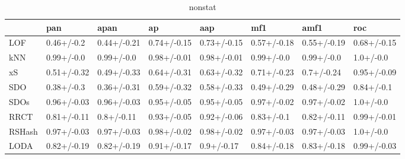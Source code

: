 \begin{table}
\centering
\caption{nonstat}
\begin{tabular}{llllllll}
\toprule
{} &          pan &         apan &           ap &          aap &          mf1 &         amf1 &          roc \\
\midrule
LOF    &   0.46+/-0.2 &  0.44+/-0.21 &  0.74+/-0.15 &  0.73+/-0.15 &  0.57+/-0.18 &  0.55+/-0.19 &  0.68+/-0.15 \\
kNN    &   0.99+/-0.0 &   0.99+/-0.0 &  0.98+/-0.01 &  0.98+/-0.01 &   0.99+/-0.0 &   0.99+/-0.0 &    1.0+/-0.0 \\
xS     &  0.51+/-0.32 &  0.49+/-0.33 &  0.64+/-0.31 &  0.63+/-0.32 &  0.71+/-0.23 &   0.7+/-0.24 &  0.95+/-0.09 \\
SDO    &   0.38+/-0.3 &  0.36+/-0.31 &  0.59+/-0.32 &  0.58+/-0.33 &  0.49+/-0.29 &  0.48+/-0.29 &   0.84+/-0.1 \\
SDOs   &  0.96+/-0.03 &  0.96+/-0.03 &  0.95+/-0.05 &  0.95+/-0.05 &  0.97+/-0.02 &  0.97+/-0.02 &    1.0+/-0.0 \\
RRCT   &  0.81+/-0.11 &   0.8+/-0.11 &  0.93+/-0.05 &  0.92+/-0.06 &   0.83+/-0.1 &  0.82+/-0.11 &  0.99+/-0.01 \\
RSHash &  0.97+/-0.03 &  0.97+/-0.03 &  0.98+/-0.02 &  0.98+/-0.02 &  0.97+/-0.03 &  0.97+/-0.03 &    1.0+/-0.0 \\
LODA   &  0.82+/-0.19 &  0.82+/-0.19 &  0.91+/-0.17 &   0.9+/-0.17 &  0.84+/-0.18 &  0.83+/-0.18 &  0.99+/-0.03 \\
\bottomrule
\end{tabular}
\end{table}
